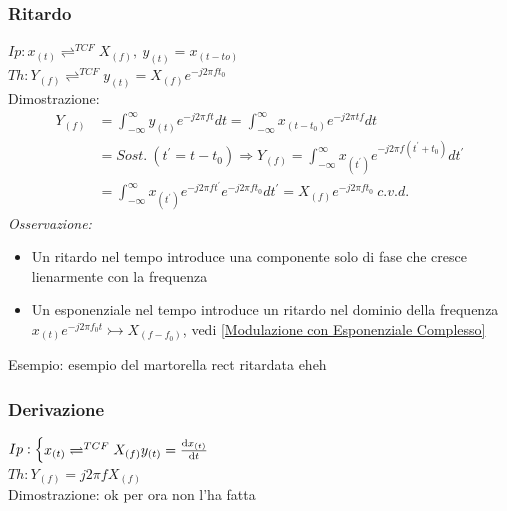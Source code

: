         \subsubsection{Ritardo}\label{Ritardo}
            $Ip: x_{(t)} \rightleftharpoons^{TCF} X_{(f)},\ y_{(t)} = x_{(t-to)}$\\        
            $Th: Y_{(f)} \rightleftharpoons^{TCF} y_{(t)} = X_{(f)}e^{-j2\pi ft_0}$\\ 
            Dimostrazione:
            \begin{align}
                Y_{(f)} & = \int_{-\infty}^{\infty} y_{(t)} e^{-j2\pi ft} dt = \int_{-\infty}^{\infty} x_{(t-t_0)} e^{-j2\pi tf} dt \nonumber \\
                        & =Sost.\ (t^\prime = t-t_0) \Rightarrow  Y_{(f)} = \int_{-\infty}^{\infty} x_{(t^\prime)} e^{-j2\pi f(t^\prime+t_0)} dt^\prime \nonumber \\
                        & =\int_{-\infty}^{\infty} x_{(t^\prime)} e^{-j2\pi ft^\prime}e^{-j2\pi ft_0} dt^\prime= X_{(f)}e^{-j2\pi ft_0}\ c.v.d.  \nonumber
            \end{align}
            {\em Osservazione:}
                \begin{itemize}
                    \item Un ritardo nel tempo introduce una componente solo di fase che cresce lienarmente con la frequenza
                    \item Un esponenziale nel tempo introduce un ritardo nel dominio della frequenza $x_{(t)}e^{-j2\pi f_0t} \rightarrowtail X_{(f-f_0)}$, vedi \ref{Modulazione con Esponenziale Complesso}
                \end{itemize}
            Esempio:
                {
                    esempio del martorella rect ritardata eheh
                }

        \subsubsection{Derivazione}\label{Derivazione}
            $Ip:\begin{cases}
                x_{(t)}\rightleftharpoons^{TCF} X_{(f)}
                y_{(t)}= \derivative{x_{(t)}}{t}\\        
            \end{cases}$\\
            $Th: Y_{(f)} = j2\pi f X_{(f)} $ \\
            Dimostrazione: ok per ora non l'ha fatta
            
